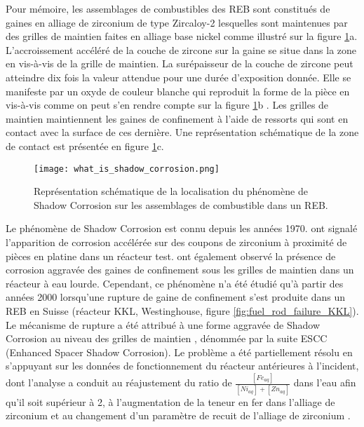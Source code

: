 \begin{refsection}
Pour mémoire, les assemblages de combustibles des REB sont constitués de gaines en alliage de zirconium de type Zircaloy-2
lesquelles sont maintenues par des grilles de maintien faites en alliage base nickel \cite{Garzarolli2011} comme
illustré sur la figure \ref{fig:what_is_shadow_corrosion}a. L'accroissement accéléré de la couche de zircone sur la gaine se situe
dans la zone en vis-à-vis de la grille de maintien. La surépaisseur de la couche de zircone peut atteindre dix fois la
valeur attendue pour une durée d'exposition donnée. Elle se manifeste par un oxyde de couleur blanche qui reproduit
la forme de la pièce en vis-à-vis comme on peut s'en rendre compte sur la figure \ref{fig:what_is_shadow_corrosion}b
\citep{Bischoff2012}.
Les grilles de maintien maintiennent les gaines de confinement à l'aide de ressorts qui sont en contact avec la surface
de ces dernière.
Une représentation schématique de la zone de contact est présentée en figure \ref{fig:what_is_shadow_corrosion}c.
 


    \begin{figure}[H] 
        \centering 
        \texttt{[image: what\_is\_shadow\_corrosion.png]}
        \caption[Schéma du phénomène de Shadow Corrosion]{Représentation schématique de la localisation du phénomène de
     Shadow Corrosion sur les assemblages de combustible dans un REB.} 
        \label{fig:what_is_shadow_corrosion} 
     \end{figure}


Le phénomène de Shadow Corrosion est connu depuis les années 1970. \citet{Johnson1974} ont signalé l’apparition de
corrosion accélérée sur des coupons de zirconium à proximité de pièces en platine dans un réacteur test.
\citet{Trowse1977} ont également observé la présence de corrosion aggravée des gaines de confinement sous les grilles
de maintien dans un réacteur à eau lourde. Cependant, ce phénomène n'a été étudié qu'à partir des années 2000 lorsqu’une
rupture de gaine de confinement s'est produite dans un REB en Suisse (réacteur KKL, Westinghouse, 
figure \ref{fig:fuel_rod_failure_KKL}).
Le mécanisme de rupture a été attribué à une forme aggravée de
Shadow Corrosion au niveau des grilles de maintien \citep{Edsinger2004}, dénommée par la suite ESCC
(Enhanced Spacer Shadow Corrosion).
Le problème a été partiellement résolu en s'appuyant sur les données de fonctionnement du réacteur antérieures à
l'incident, dont l'analyse a conduit au réajustement du ratio de $\frac{[Fe_{aq}]}{[Ni_{aq}]+[Zn_{aq}]}$ 
dans l'eau afin qu'il soit supérieur à 2, à l'augmentation de la teneur en fer dans l'alliage 
de zirconium et au changement d'un paramètre de recuit de l'alliage de zirconium \citep{Edsinger2004}.


\end{refsection}
